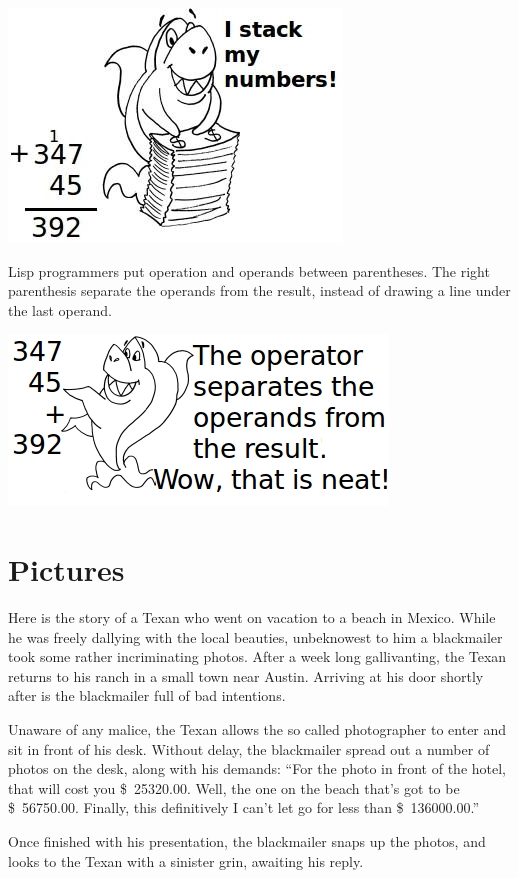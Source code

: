 \documentclass[a4paper,12pt]{book}
\begin{document}
\includegraphics{figs-prefix/stackshark.jpg}


Lisp programmers put operation and operands
between parentheses. The right parenthesis
separate the operands from the result,
instead of drawing a line under the last operand.

\includegraphics{figs-prefix/neatsum.jpg}

\section{Pictures}
Here is the story of a Texan who went on
vacation to a beach in Mexico. While he was
freely dallying with the local beauties,
unbeknowest to him a blackmailer took some
rather incriminating photos.
After a week long gallivanting, the Texan
returns to his ranch in a small town near Austin.
Arriving at his door shortly after is the blackmailer
full of bad intentions.

Unaware of any malice, the Texan allows the so
called photographer to enter and sit in front
of his desk. Without delay, the blackmailer spread
out a number of photos on the desk, along with his
demands: “For the photo in front of the hotel,
that will cost you \$~25320.00. Well, the one
on the beach that's got to be \$~56750.00.
Finally, this definitively I can't let
go for less than \$~136000.00.”

Once finished with his presentation,
the blackmailer snaps up the photos,
and looks to the Texan with a sinister
grin, awaiting his reply.
\end{document}
